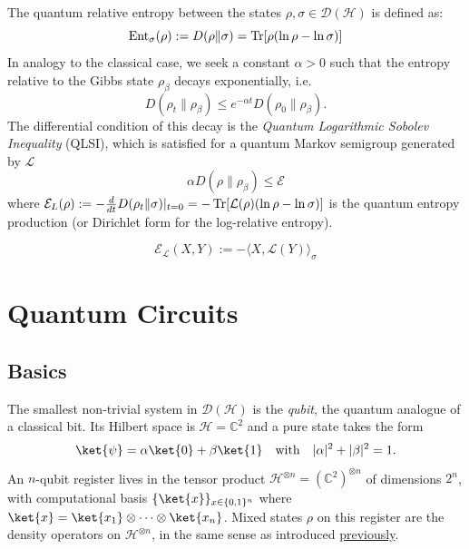 The quantum relative entropy between the states $\rho, \sigma \in \mathcal{D(H)}$ is defined as:
\begin{equation} 
    \text{Ent}_{\sigma}(\rho) := D(\rho \| \sigma) = \operatorname{Tr}[ \rho (\ln \rho - \ln \sigma)]
\end{equation}
In analogy to the classical case, we seek a constant $\alpha > 0$ such that the entropy relative to the Gibbs state $\rho_\beta$ decays exponentially, i.e.
$$
D(\rho_t \| \rho_\beta) \leq e^{-\alpha t} D(\rho_0 \| \rho_\beta).
$$
The differential condition of this decay is the \textit{Quantum Logarithmic Sobolev Inequality} (QLSI), which is satisfied for a quantum Markov semigroup generated by $\mathcal{L}$
\begin{equation}
    \alpha D(\rho \| \rho_\beta) \leq \mathcal{E}
\end{equation}
where $\mathcal{E}_L(\rho) := -\frac{d}{dt} D(\rho_t \| \sigma)|_{t=0} = -\operatorname{Tr}[\mathcal{L}(\rho)(\ln \rho - \ln \sigma)]$ is the quantum entropy production (or Dirichlet form for the log-relative entropy).

$$\mathcal{E_L}(X, Y) := -\langle X, \mathcal{L}(Y)\rangle_{\sigma}$$

\chapter{Quantum Circuits}
\smallskip
\section{Basics}
The smallest non-trivial system in $\mathcal{D(H)}$ is the \emph{qubit}, the quantum analogue of a classical bit. Its Hilbert space is $\mathcal{H} = \mathbb{C}^2$ and a pure state takes the form
$$
\ket{\psi} = \alpha\ket{0} + \beta\ket{1}\quad\text{with}\quad |\alpha|^2 + |\beta|^2 = 1.
$$
An $n$-qubit register lives in the tensor product $\mathcal{H}^{\otimes n} = (\mathbb{C}^2)^{\otimes n}$ of dimensions $2^n$, with computational basis $\{\ket{x}\}_{x\in\{0,1\}^n}$ where $\ket{x} = \ket{x_1}\otimes\cdots\otimes\ket{x_n}$. Mixed states $\rho$ on this register are the density operators on $\mathcal{H}^{\otimes n}$, in the same sense as introduced \hyperref[sec:quantum-states]{previously}.

